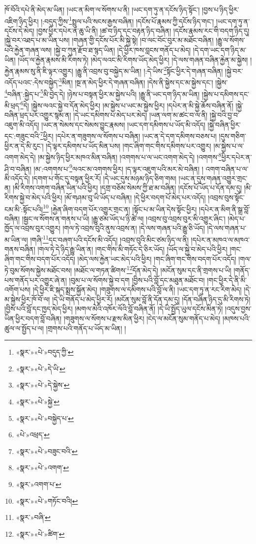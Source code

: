 ཁོ་བོའི་དཔེ་ནི་མེད་མ་ཡིན། །ཡང་ན་མིག་ལ་སོགས་པ་ནི། །ཡང་དག་ཏུ་ན་དངོས་ཉིད་སྟོང་། །བྱས་པ་ཉིད་ཕྱིར་འཇིག་ཉིད་ཕྱིར། །:བདུད་ཀྱིས་\footnote{«སྣར་»«པེ་»བདུད་ཀྱི་}སྤྲུལ་པའི་སངས་རྒྱས་བཞིན། །དངོས་པོ་རྣམས་ཀྱི་དངོས་ཉིད་གང་། །ཡང་དག་ཏུ་ན་དངོས་དེ་མེད། །བྱས་ཕྱིར་དཔེར་ན་ཆུ་ཡི་ནི། །ཚ་བ་ཉིད་དང་བརྟན་ཉིད་བཞིན། །དངོས་རྣམས་རང་གི་བདག་ཉིད་དུ། །སྐྱེ་བར་འཐད་པ་མ་ཡིན་པས། །གཞན་གྱི་དངོས་པོར་མི་སྐྱེ་སྟེ། །བ་ལང་བོང་བུར་མ་མཐོང་བཞིན། །རྒྱུ་ལ་སོགས་པའི་རྐྱེན་གཞན་ལས། །སྐྱེ་བ་ཀུན་རྫོབ་ཐ་སྙད་ཡིན། །དེ་ཕྱིར་ཁས་བླངས་གནོད་པ་མེད། །དེ་དག་ཡང་དག་ཉིད་མ་ཡིན། །ཡོད་ལ་རྐྱེན་རྣམས་མི་རིགས་ཏེ། །མེད་ལའང་མི་རིགས་ཡོད་མེད་ཕྱིར། །དེ་ལས་གཞན་བཞིན་རྐྱེན་མ་སྐྱེས། །རྐྱེན་རྣམས་སུ་ནི་ཇི་ལྟར་འགྱུར། །རྒྱུ་ནི་འབྲས་བུ་བསྐྱེད་མ་ཡིན། །:དེ་ཡིས་\footnote{«སྣར་»«པེ་»དེ་ཡི་}སྟོང་ཕྱིར་དེ་གཞན་བཞིན། །སྐྱེ་བར་འདོད་པའང་:དེས་བསྐྱེད་\footnote{«སྣར་»«པེ་»དེ་སྐྱེས་}མིན། །སྔ་ན་མེད་ཕྱིར་དེ་གཞན་བཞིན། །དེས་ནི་སྐྱེས་དང་མ་སྐྱེས་དང་། །སྐྱེས་\footnote{«སྣར་»«པེ་»སྐྱེ་}བཞིན་:སྐྱེད་པ་\footnote{«སྣར་»«པེ་»བསྐྱེད་པ་}མི་བྱེད་དེ། །ཉེས་པ་བསྟན་ཕྱིར་མ་སྐྱེས་པའི། །རྒྱུ་ནི་ཡང་དག་ཉིད་མ་ཡིན། །སྐྱེས་པ་དམིགས་དང་མི་ཕྲད་\footnote{«པེ་»འཕྲད་}དེ། །སྐྱེས་ལའང་སྐྱེ་བ་དོན་མེད་ཕྱིར། །མ་སྐྱེས་པ་ཡང་མ་སྐྱེས་ཕྱིར། །དཔེར་ན་མི་སྐྱེ་ཆོས་བཞིན་ནོ། །སྐྱེ་བཞིན་ཕྲད་པར་འགྱུར་སྙམ་ན། །དེ་ཡང་དམིགས་པ་མེད་པར་མེད། །ཡན་ལག་མ་ཚང་བ་ལ་ནི། །སྐྱེ་བའི་བྱ་བ་འཇུག་མི་འདོད། །ཡང་ན་སེམས་དང་སེམས་བྱུང་རྣམས། །ཡང་དག་དམིགས་པ་ཡོད་མི་འདོད། །སྐྱེ་བཞིན་ཕྱིར་དང་:གཟུང་བའི་\footnote{«སྣར་»«པེ་»བཟུང་བའི་}ཕྱིར། །དཔེར་ན་གཟུགས་ལ་སོགས་པ་བཞིན། །ཡང་ན་དེ་དག་དམིགས་བཅས་པ། །དུས་གཅིག་ཕྱིར་ན་དེ་མི་རུང་། །དེ་ལྟར་དམིགས་པ་ཡོད་མིན་པས། །གང་ཞིག་གང་གིས་དམིགས་པར་འགྱུར། །མ་སྐྱེས་པ་ལ་འགག་མེད་དེ། །མ་སྐྱེས་ཉིད་ཕྱིར་མཁའ་མིན་བཞིན། །འགགས་པ་ལ་ཡང་འགག་མེད་དེ། །འགགས་\footnote{«སྣར་»«པེ་»འགག་}ཕྱིར་དཔེར་ན་ཤི་བ་བཞིན། །མ་:འགགས་པ་\footnote{«སྣར་»འགག་པ་}ལའང་མ་འགགས་ཕྱིར། །ད་ལྟར་འཇུག་པའི་མར་མེ་བཞིན། །
འགག་བཞིན་པ་ལ་མི་འདོད་དེ། །དགག་པ་གོང་དུ་བསྟན་ཕྱིར་རོ། །དེ་ཡང་དུས་མཉམ་ཉིད་ཅིག་གམ། །ཡང་ན་དུས་གཞན་འགྱུར་གྲང་ན། །མི་རིགས་འགག་བཞིན་ཡིན་པའི་ཕྱིར། །དགྲ་བཅོམ་སེམས་ཀྱི་ཐ་མ་བཞིན། །དངོས་པོ་ཡོད་པ་དོན་དམ་དུ། །མི་རིགས་སྐྱེ་བ་མེད་པའི་ཕྱིར། །མོ་གཤམ་བུ་ཡི་ཡོད་པ་བཞིན། །དེ་ཕྱིར་བདག་པོ་མེད་པར་འདོད། །འབྲས་བུས་སྟོང་ངམ་མི་:སྟོང་པའི།\footnote{«སྣར་»«པེ་»གཏོང་བའི།} །རྐྱེན་ཞིག་བདག་པོར་འགྱུར་གྲང་ན། །སྟོང་པ་མ་ཡིན་དེས་སྟོང་ཕྱིར། །དཔེར་ན་མིག་ནི་སྒྲ་བློ་བཞིན། །སྦྱང་ལ་སོགས་ན་གནས་པ་ཡི། །རྒྱུ་ཙམ་ཡོད་པ་ཉི་ཚེ་ལ། །འབྲས་བུ་འབྲས་བུར་མི་འགྱུར་ཞིང་། །མེད་པ་ཁྱོད་ལ་འབྲས་བུར་འགྱུར། །གལ་ཏེ་འབྲས་བུའི་ནུས་འབྲས་ན། །དེ་ལས་གཞན་པའི་རྒྱུ་ཅི་ཡོད། །དེ་ལས་གཞན་པ་མ་ཡིན་ལ། །གཞི་\footnote{«སྣར་»བཞི་}དང་བཞག་པའི་དངོས་མི་འདོད། །འབྲས་བུའི་མིང་ཙམ་ཉིད་ལ་ནི། །དཔེར་ན་མཁའ་ལ་མཁའ་གནས་བཞིན། །གལ་ཏེ་དེ་ཉིད་རྒྱུ་ཡིན་ན། །གང་གིས་མི་གཏོང་དེ་ཅིར་ཡོད། །ཡོད་ལ་སྐྱེ་བ་མེད་པའི་ཕྱིར། །གང་ཞིག་གང་གིས་བདག་པོར་འདོད། །མེད་ལས་རྐྱེན་ཡང་མེད་པའི་ཕྱིར། །གང་ཞིག་གང་གིས་བདག་པོར་འདོད། །གལ་ཏེ་བུམ་སོགས་སྐྱེས་མཐོང་བས། །མཐོང་ལ་གཏན་ཚིགས་\footnote{«སྣར་»«པེ་»ཚིག་}དོན་མེད་དེ། །མངོན་སུམ་དང་ནི་གྲགས་པ་ཡི། །གནོད་པས་གནོད་པར་འགྱུར་ཞེ་ན། །བུམ་པ་ལ་སོགས་སྐྱེ་བ་དག །བྱིས་པའི་བློ་དང་མཐུན་མཐོང་བ། །གང་ཕྱིར་དེ་ནི་མི་འགོག་པས། །དེ་ཕྱིར་ཇི་སྐད་སྨྲས་སྐྱོན་མེད། །གཟུགས་ལ་དམིགས་པའི་བློ་ལ་ནི། །ཡང་དག་ཏུ་ན་རང་རིག་མེད། །དེ་མ་སྐྱེས་ཕྱིར་ཁོ་བོ་ལ། །དེ་ཡི་གནོད་པ་མེད་ཕྱིར་རོ། །མངོན་སུམ་བློ་ནི་དོན་དམ་དུ། །དོན་བཞིན་ཉིད་དུ་མི་རིགས་ཏེ། །བྱིས་པའི་བློ་དང་ཁྱད་མེད་ཕྱིར། །མགལ་མེའི་འཁོར་ལོའི་བློ་བཞིན་ནོ། །དེ་ཡི་སྤྱོད་ཡུལ་དངོས་མིན་ཏེ། །འདུས་བྱས་ཡིན་ཕྱིར་བདག་བློ་བཞིན། །གཟུགས་ལ་སོགས་པ་རྫས་མིན་ཕྱིར། །ངེད་ལ་མངོན་སུམ་གནོད་པ་མེད། །མཁས་པའི་ཚུལ་ལ་སྤྱོད་པ་ལ། །གྲགས་པའི་གནོད་པ་ཡོད་མ་ཡིན། །
